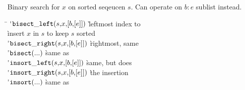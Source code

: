 
Binary search for $x$ on sorted seqeucen $s$.  Can operate on $b\!:\!e$ sublist instead.

\begin{tabbing}
\hspace{2em}\= \kill
\'$\mathop{\mathtt{bisect\_left}}(s,\!x,\!{[}{b,\!{[}{e}{]}}{]})$ \` leftmost index to \\ \` insert $x$ in $s$ to keep $s$ sorted \\
\'$\mathop{\mathtt{bisect\_right}}(s,\!x,\!{[}{b,\!{[}{e}{]}}{]})$ \` rightmost, same \\
\'$\mathop{\mathtt{bisect}}(...)$ \` same as  \\
\'$\mathop{\mathtt{insort\_left}}(s,\!x,\!{[}{b,\!{[}{e}{]}}{]})$ \` same, but does \\
\'$\mathop{\mathtt{insort\_right}}(s,\!x,\!{[}{b,\!{[}{e}{]}}{]})$ \` the insertion \\
\'$\mathop{\mathtt{insort}}(...)$ \` same as  \\
\end{tabbing}